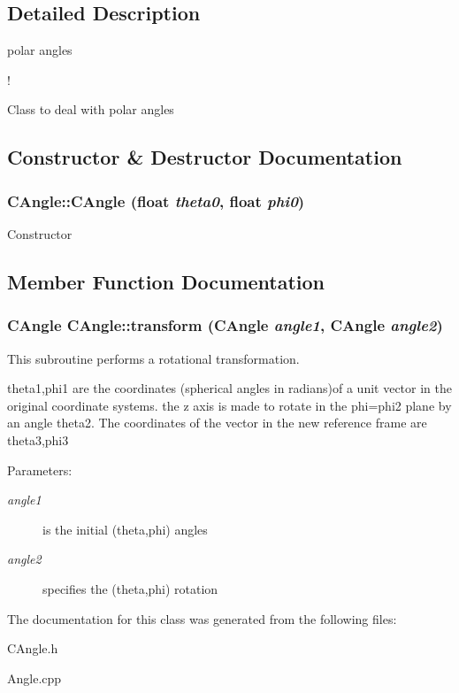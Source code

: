 \subsection{Detailed Description}
polar angles 

!

Class to deal with polar angles 



\subsection{Constructor \& Destructor Documentation}
\subsubsection{\setlength{\rightskip}{0pt plus 5cm}CAngle::CAngle (float {\em theta0}, float {\em phi0})}\label{classCAngle_770240957a6278e10a64feac3520ad35}


Constructor 

\subsection{Member Function Documentation}
\subsubsection{\setlength{\rightskip}{0pt plus 5cm}\bf{CAngle} CAngle::transform (\bf{CAngle} {\em angle1}, \bf{CAngle} {\em angle2})\hspace{0.3cm}{\tt  [static]}}\label{classCAngle_f3a0e3ec6de33872a9fa8e57b69bd068}


This subroutine performs a rotational transformation.

theta1,phi1 are the coordinates (spherical angles in radians)of a unit vector in the original coordinate systems. the z axis is made to rotate in the phi=phi2 plane by an angle theta2. The coordinates of the vector in the new reference frame are theta3,phi3

\begin{Desc}
\item[Parameters:]
\begin{description}
\item[{\em angle1}]is the initial (theta,phi) angles \item[{\em angle2}]specifies the (theta,phi) rotation \end{description}
\end{Desc}


The documentation for this class was generated from the following files:\begin{CompactItemize}
\item 
CAngle.h\item 
Angle.cpp\end{CompactItemize}
